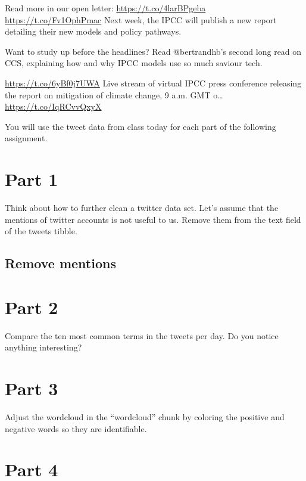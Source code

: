 \documentclass[
]{article}
\begin{document}
Read more in our open letter: \url{https://t.co/4larBPgeba}
\url{https://t.co/Fv1OphPmac} \textbar{} \textbar Next week, the IPCC
will publish a new report detailing their new models and policy
pathways.

Want to study up before the headlines? Read @bertrandhb's second long
read on CCS, explaining how and why IPCC models use so much saviour
tech.

\url{https://t.co/6yBf0j7UWA} \textbar{} \textbar Live stream of virtual
IPCC press conference releasing the report on mitigation of climate
change, 9 a.m. GMT o\ldots{} \url{https://t.co/IqRCvvQxyX} \textbar{}

\newpage

You will use the tweet data from class today for each part of the
following assignment.

\hypertarget{part-1}{%
\section{Part 1}\label{part-1}}

Think about how to further clean a twitter data set. Let's assume that
the mentions of twitter accounts is not useful to us. Remove them from
the text field of the tweets tibble.

\hypertarget{remove-mentions}{%
\subsection{Remove mentions}\label{remove-mentions}}

\newpage

\hypertarget{part-2}{%
\section{Part 2}\label{part-2}}

Compare the ten most common terms in the tweets per day. Do you notice
anything interesting?

\newpage

\hypertarget{part-3}{%
\section{Part 3}\label{part-3}}

Adjust the wordcloud in the ``wordcloud'' chunk by coloring the positive
and negative words so they are identifiable.

\newpage

\hypertarget{part-4}{%
\section{Part 4}\label{part-4}}
\end{document}
